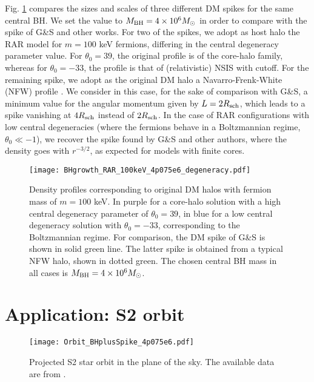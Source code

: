 \documentclass[baaa]{baaa}
\begin{document}
Fig. \ref{fig:degeneracy} compares the sizes and scales of three different DM spikes for the same central BH. We set the value to $M_{\rm BH}=4\times 10^6 M_\odot$ in order to compare with the spike of G\&S and other works.
For two of the spikes, we adopt as host halo the RAR model for $m=100$ keV fermions, differing in the central degeneracy parameter value. For $\theta_0=39$, the original profile is of the core-halo family, whereas for $\theta_0=-33$, the profile is that of (relativistic) NSIS with cutoff. 
For the remaining spike, we adopt as the original DM halo a Navarro-Frenk-White (NFW) profile \citep{navarro1997universal}. 
We consider in this case, for the sake of comparison with G\&S, a minimum value for the angular momentum given by $L=2R_{\rm sch}$, which leads to a spike vanishing at $4R_{\rm sch}$ instead of $2R_{\rm sch}$.
In the case of RAR configurations with low central degeneracies (where the fermions behave in a Boltzmannian regime, $\theta_0 \ll -1$), we recover the spike found by G\&S and other authors, where the density goes with $r^{-3/2}$, as expected for models with finite cores.
%
\begin{figure}[t]
    \centering
    \texttt{[image: BHgrowth\_RAR\_100keV\_4p075e6\_degeneracy.pdf]}
    \caption{Density profiles corresponding to original DM halos with fermion mass of $m=100$ keV. In purple for a core-halo solution with a high central degeneracy parameter of $\theta_0=39$, in blue for a low central degeneracy solution with $\theta_0=-33$, corresponding to the Boltzmannian regime. For comparison, the DM spike of G\&S is shown in solid green line. 
    The latter spike is obtained from a typical NFW halo, shown in dotted green. 
    The chosen central BH mass in all cases is $M_{\rm BH}=4 \times 10^6 M_\odot$.}
    \label{fig:degeneracy}
\end{figure}
\section{Application: S2 orbit}\label{sec:application}

\begin{figure}[t]
    \centering
    \texttt{[image: Orbit\_BHplusSpike\_4p075e6.pdf]}
    \caption{Projected S2 star orbit in the plane of the sky. The available data are from \cite{do2019relativistic}. }
    \label{fig:orbit}
\end{figure}
\end{document}
